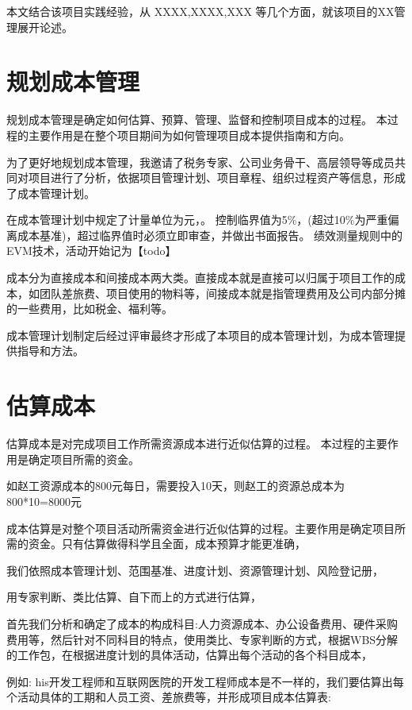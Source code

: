 \documentclass[UTF8]{../computerUniverse}
\begin{document}
本文结合该项目实践经验，从
XXXX,XXXX,XXX
等几个方面，就该项目的XX管理展开论述。


\section{规划成本管理}

规划成本管理是确定如何估算、预算、管理、监督和控制项目成本的过程。
本过程的主要作用是在整个项目期间为如何管理项目成本提供指南和方向。




为了更好地规划成本管理，我邀请了税务专家、公司业务骨干、高层领导等成员共同对项目进行了分析，依据项目管理计划、项目章程、组织过程资产等信息，形成了成本管理计划。


在成本管理计划中规定了计量单位为元，。
控制临界值为5\%，(超过10\%为严重偏离成本基准)，超过临界值时必须立即审查，并做出书面报告。
绩效测量规则中的EVM技术，活动开始记为【todo】



成本分为直接成本和间接成本两大类。直接成本就是直接可以归属于项目工作的成本，如团队差旅费、项目使用的物料等，间接成本就是指管理费用及公司内部分摊的一些费用，比如税金、福利等。

成本管理计划制定后经过评审最终才形成了本项目的成本管理计划，为成本管理提供指导和方法。




\section{估算成本}

估算成本是对完成项目工作所需资源成本进行近似估算的过程。
本过程的主要作用是确定项目所需的资金。


如赵工资源成本的800元每日，需要投入10天，则赵工的资源总成本为800*10=8000元


成本估算是对整个项目活动所需资金进行近似估算的过程。主要作用是确定项目所需的资金。只有估算做得科学且全面，成本预算才能更准确，

我们依照成本管理计划、范围基准、进度计划、资源管理计划、风险登记册，

用专家判断、类比估算、自下而上的方式进行估算，

首先我们分析和确定了成本的构成科目:人力资源成本、办公设备费用、硬件采购费用等，然后针对不同科目的特点，使用类比、专家判断的方式，根据WBS分解的工作包，在根据进度计划的具体活动，估算出每个活动的各个科目成本，

例如: his开发工程师和互联网医院的开发工程师成本是不一样的，我们要估算出每个活动具体的工期和人员工资、差旅费等，并形成项目成本估算表:
\end{document}
